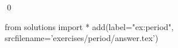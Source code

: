 
\begin{ex} 
  \label{ex:period}
  
  \qed
\end{ex} 
\begin{python0}
from solutions import *
add(label="ex:period",
    srcfilename='exercises/period/answer.tex') 
\end{python0}
